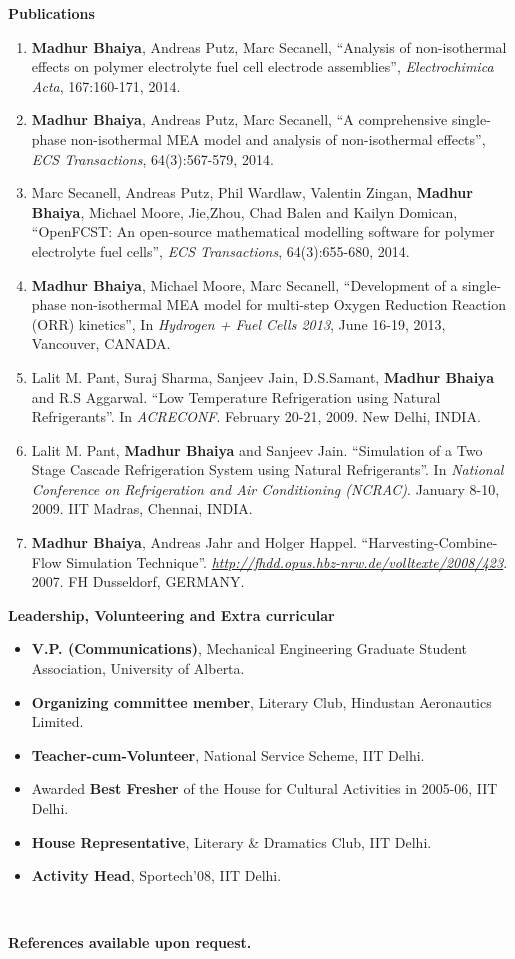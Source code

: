 \documentclass[letterpaper,11pt]{article}
\newcommand{\resitem}[1]{\item #1 \vspace{-2pt}}
\newcommand{\resheading}[1]{{\large \colorbox{mygrey}{\begin{minipage}{\textwidth}{\textbf{#1 \vphantom{p\^{E}}}}\end{minipage}}}}
\begin{document}
\resheading{Publications}
\begin{enumerate}
	\resitem{{\small \textbf{Madhur Bhaiya}, Andreas Putz, Marc Secanell, ``Analysis of non-isothermal effects on polymer electrolyte fuel cell electrode assemblies'', {\it Electrochimica Acta}, 167:160-171, 2014.}}

	\resitem{{\small \textbf{Madhur Bhaiya}, Andreas Putz, Marc Secanell, ``A comprehensive single-phase non-isothermal MEA model and analysis of non-isothermal effects'', {\it ECS Transactions}, 64(3):567-579, 2014.}}

	\resitem{{\small Marc Secanell, Andreas Putz, Phil Wardlaw, Valentin Zingan, \textbf{Madhur Bhaiya}, Michael Moore, Jie,Zhou, Chad Balen and Kailyn Domican, ``OpenFCST: An open-source mathematical modelling software for polymer electrolyte fuel cells'', {\it ECS Transactions}, 64(3):655-680, 2014.}}

	\resitem{{\small \textbf{Madhur Bhaiya}, Michael Moore, Marc Secanell, ``Development of a single-phase non-isothermal MEA model for multi-step
				Oxygen Reduction Reaction (ORR) kinetics'', In {\it Hydrogen + Fuel Cells 2013}, June 16-19, 2013, Vancouver, CANADA.}}

	\resitem{{\small Lalit M. Pant, Suraj Sharma, Sanjeev Jain, D.S.Samant, \textbf{Madhur Bhaiya} and R.S Aggarwal.  ``Low Temperature Refrigeration using Natural Refrigerants''.  In {\it ACRECONF}.  February 20-21, 2009. New Delhi, INDIA. }}

	\resitem{{\small Lalit M. Pant, \textbf{Madhur Bhaiya} and Sanjeev Jain.  ``Simulation of a Two Stage Cascade Refrigeration System using Natural Refrigerants''. In {\it National Conference on Refrigeration and Air Conditioning (NCRAC)}. January 8-10, 2009. IIT Madras, Chennai, INDIA. }}

	\resitem{{\small \textbf{Madhur Bhaiya}, Andreas Jahr and Holger Happel.  ``Harvesting-Combine-Flow Simulation Technique''. \href{http://fhdd.opus.hbz-nrw.de/volltexte/2008/423}{ {\it http://fhdd.opus.hbz-nrw.de/volltexte/2008/423}}. 2007. FH Dusseldorf, GERMANY. }}
\end{enumerate}

\resheading{Leadership, Volunteering and Extra curricular}
\begin{itemize}
	\item \textbf{V.P. (Communications)}, Mechanical Engineering Graduate Student Association, University of Alberta.
	\item \textbf{Organizing committee member}, Literary Club, Hindustan Aeronautics Limited.
	\item \textbf{Teacher-cum-Volunteer}, National Service Scheme, IIT Delhi.
	\item Awarded \textbf{Best Fresher} of the House for Cultural Activities in 2005-06, IIT Delhi.
	\item \textbf{House Representative}, Literary \& Dramatics Club, IIT Delhi.
	\item \textbf{Activity Head}, Sportech'08, IIT Delhi.
\end{itemize} \hline \hline ~\\ \vspace{-0.05pt}

\centerline{\textbf{References available upon request.}}
\end{document}
